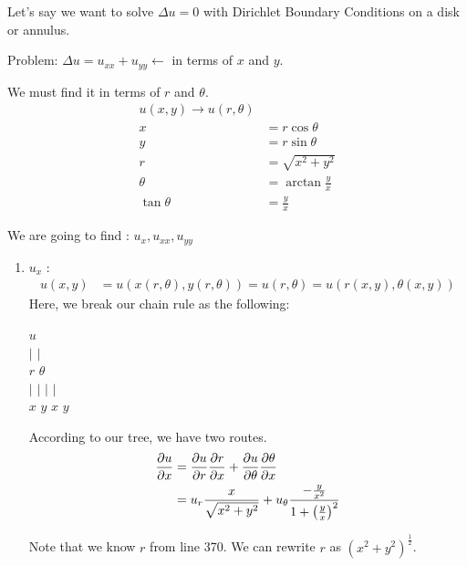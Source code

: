 \documentclass{article}
\begin{document}

Let's say we want to solve $\Delta u = 0$ with Dirichlet Boundary Conditions on a disk or annulus.

Problem: $\Delta u = u_{xx} + u_{yy} \leftarrow $ in terms of $x$ and $y$.

We must find it in terms of $r$ and $\theta$.
%
\begin{align}
  u(x, y) \rightarrow u(r, \theta)\\
  x & = r \cos \theta\\
  y & = r \sin \theta\\
  r & = \sqrt{x^2 + y^2}\\
  \theta & = \arctan \frac{y}{x}\\
  \tan \theta & = \frac{y}{x}
\end{align}

We are going to find : $u_x, u_{xx}, u_{yy}$
%
\begin{enumerate}
  \item $u_x$ :
  \begin{align}
    u(x, y) & = u( x(r, \theta), y(r, \theta)) = u(r, \theta) = u(r(x, y), \theta(x, y))
  \end{align}
  Here, we break our chain rule as the following:
  \begin{center}
    $u$\\
    $|$ \quad \quad $|$\\
    $r$ \quad \quad $\theta$\\
    $|$ \quad $|$ \quad $|$ \quad $|$\\
    $x$ \quad $y$ \quad $x$ \quad $y$
  \end{center}

  According to our tree, we have two routes.
  \begin{align}
    \frac{\partial u}{\partial x} & = \frac{\partial u}{\partial r} \frac{\partial r}{\partial x} + \frac{\partial u}{\partial \theta} \frac{\partial \theta}{\partial x}\\
    & = u_r \frac{x}{\sqrt{x^2 + y^2}} + u_\theta \frac{- \frac{y}{x^2}}{1 + \left( \frac{y}{x}\right)^2}
  \end{align}

  Note that we know $r$ from line 370. We can rewrite $r$ as $(x^2 + y^2)^{\frac{1}{2}}$.
\end{enumerate}
\end{document}
